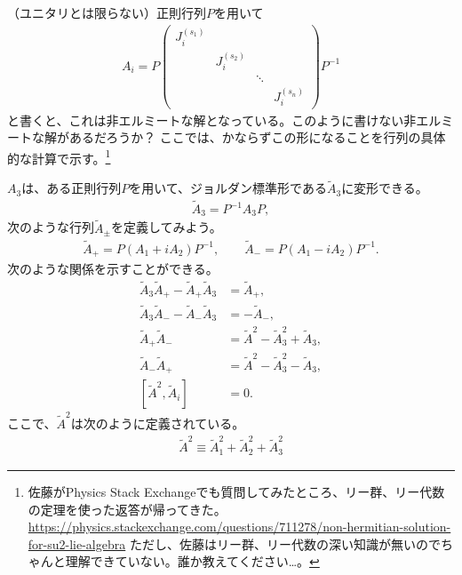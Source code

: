 \documentclass[10pt,a4paper]{jarticle}
\begin{document}
（ユニタリとは限らない）正則行列$P$を用いて
\begin{align}
A_i = P
\left(\begin{array}{cccc}
J_i^{(s_1)} &&& \\
& J_i^{(s_2)} && \\
&& \ddots & \\
&&& J_i^{(s_n)}
\end{array}\right)
P^{-1}
\end{align}
と書くと、これは非エルミートな解となっている。このように書けない非エルミートな解があるだろうか？
ここでは、かならずこの形になることを行列の具体的な計算で示す。\footnote{佐藤がPhysics Stack Exchangeでも質問してみたところ、リー群、リー代数の定理を使った返答が帰ってきた。
\url{https://physics.stackexchange.com/questions/711278/non-hermitian-solution-for-su2-lie-algebra}
ただし、佐藤はリー群、リー代数の深い知識が無いのでちゃんと理解できていない。誰か教えてください…。}



$A_3$は、ある正則行列$P$を用いて、ジョルダン標準形である$\tilde A_3$に変形できる。
\begin{align}
\tilde A_3 = P^{-1} A_3 P,
\end{align}
%
次のような行列$\tilde A_{\pm}$を定義してみよう。
\begin{align}
\tilde A_+ = P(A_1 + i A_2)P^{-1}, \qquad
\tilde A_- = P(A_1 - i A_2)P^{-1}.
\end{align}
%
次のような関係を示すことができる。
\begin{align}
\tilde A_3 \tilde A_+ - \tilde A_+ \tilde A_3 &= \tilde A_+ \label{eq:[a3,a+]}, \\
\tilde A_3 \tilde A_- - \tilde A_- \tilde A_3 &= -\tilde A_-, \label{eq:[a3,a-]}\\
\tilde A_+ \tilde A_- &= \tilde A^2 - \tilde A_3^2 + \tilde A_3, \label{eq:A+ A-} \\
\tilde A_- \tilde A_+ &= \tilde A^2 - \tilde A_3^2 - \tilde A_3, \label{eq:A- A+} \\
[\tilde A^2, \tilde A_i] &= 0. \label{eq:casimir}
\end{align}
ここで、$\tilde A^2$は次のように定義されている。
\begin{align}
\tilde A^2 \equiv \tilde A_1^2 + \tilde A_2^2 + \tilde A_3^2
\end{align}
\end{document}
